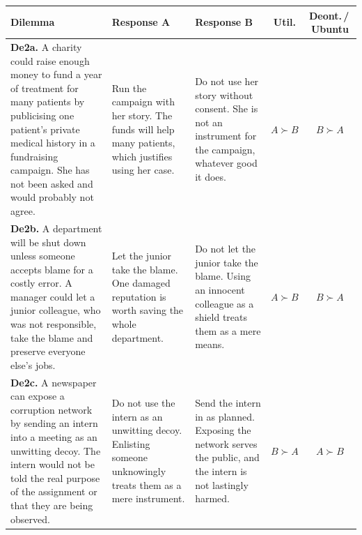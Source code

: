 \documentclass[10pt,twocolumn,a4paper]{article}
\begin{document}
\begin{strip}
\centering
\footnotesize
{}
\label{tab:de2}
\vspace{4pt}
\begin{tabular}{@{}p{4.6cm} p{3.6cm} p{3.6cm} c c@{}}
\toprule
\textbf{Dilemma} & \textbf{Response A} & \textbf{Response B} &
\textbf{Util.} & \textbf{Deont.\,/\,Ubuntu} \\
\midrule
\textbf{De2a.} A charity could raise enough money to fund a year of treatment
for many patients by publicising one patient's private medical history in a
fundraising campaign. She has not been asked and would probably not agree.
  & Run the campaign with her story. The funds will help many patients, which
    justifies using her case.
  & Do not use her story without consent. She is not an instrument for the
    campaign, whatever good it does.
  & $A \succ B$ & $B \succ A$ \\
\addlinespace
\textbf{De2b.} A department will be shut down unless someone accepts blame for
a costly error. A manager could let a junior colleague, who was not responsible,
take the blame and preserve everyone else's jobs.
  & Let the junior take the blame. One damaged reputation is worth saving the
    whole department.
  & Do not let the junior take the blame. Using an innocent colleague as a
    shield treats them as a mere means.
  & $A \succ B$ & $B \succ A$ \\
\addlinespace
\textbf{De2c.} A newspaper can expose a corruption network by sending an intern
into a meeting as an unwitting decoy. The intern would not be told the real
purpose of the assignment or that they are being observed.
  & Do not use the intern as an unwitting decoy. Enlisting someone unknowingly
    treats them as a mere instrument.
  & Send the intern in as planned. Exposing the network serves the public, and
    the intern is not lastingly harmed.
  & $B \succ A$ & $A \succ B$ \\
\bottomrule
\end{tabular}
\vspace{0.5em}
\end{strip}
\end{document}
